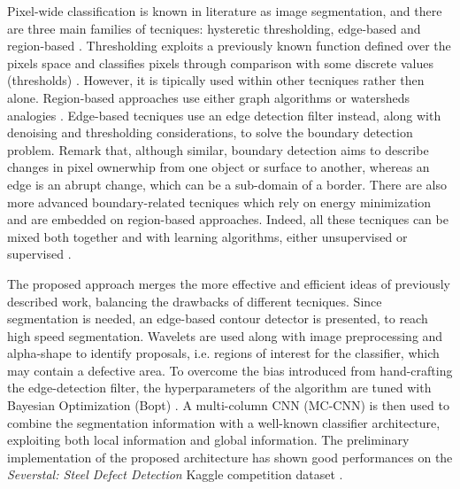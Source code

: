     \par{
        Pixel-wide classification is known in literature as image segmentation, and there are three main families of tecniques: hysteretic thresholding, edge-based and region-based \cite{ieee:7684170}. Thresholding exploits a previously known function defined over the pixels space and classifies pixels through comparison with some discrete values (thresholds) \cite{ieee:4310039}. However, it is tipically used within other tecniques rather then alone. Region-based approaches use either graph algorithms \cite{ieee:6205760, ieee:868688} or watersheds analogies \cite{ieee:87344}. Edge-based tecniques use an edge detection filter \cite{Klette:2014:CCV:2584519, googlescholar:kovesiphase, researchgate:phase} instead, along with denoising and thresholding considerations, to solve the boundary detection problem. Remark that, although similar, boundary detection aims to describe changes in pixel ownerwhip from one object or surface to another, whereas an edge is an abrupt change, which can be a sub-domain of a border. There are also more advanced boundary-related tecniques \cite{springer:Kass1988} which rely on energy minimization and are embedded on region-based approaches. Indeed, all these tecniques can be mixed both together and with learning algorithms, either unsupervised \cite{ieee:7684170} or supervised \cite{ieee:1273918}.
    }
    \par{
        The proposed approach merges the more effective and efficient ideas of previously described work, balancing the drawbacks of different tecniques. Since segmentation is needed, an edge-based contour detector is presented, to reach high speed segmentation. Wavelets are used along with image preprocessing and alpha-shape \cite{springer:10.1007/11907350_46} to identify proposals, i.e. regions of interest for the classifier, which may contain a defective area. To overcome the bias introduced from hand-crafting the edge-detection filter, the hyperparameters of the algorithm are tuned with Bayesian Optimization (Bopt) \cite{arXiv:2018arXiv180702811F, arXiv:2012arXiv1206.2944S, rasmussen:williams:2006}. A multi-column CNN (MC-CNN) \cite{ieee:6248110} is then used to combine the segmentation information with a well-known classifier architecture, exploiting both local information and global information. The preliminary implementation of the proposed architecture has shown good performances on the \emph{Severstal: Steel Defect Detection} Kaggle competition dataset \cite{kaggle:severstal}.
    }